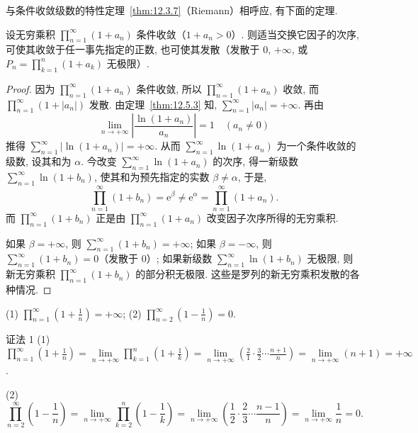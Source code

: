 与条件收敛级数的特性定理~\ref{thm:12.3.7}（Riemann）相呼应, 有下面的定理.

\begin{theorem}[条件收敛无穷乘积的特性]\label{thm:12.5.7}
设无穷乘积 $\prod_{n=1}^{\infty}(1+a_{n})$ 条件收敛（$1+a_{n}>0$）. 则适当交换它因子的次序, 可使其收敛于任一事先指定的正数, 也可使其发散（发散于 $0$, $+\infty$, 或 $P_{n}=\prod_{k=1}^{n}(1+a_{k})$ 无极限）.
\end{theorem}

\begin{proof}
因为 $\prod_{n=1}^{\infty}(1+a_{n})$ 条件收敛, 所以 $\prod_{n=1}^{\infty}(1+a_{n})$ 收敛, 而 $\prod_{n=1}^{\infty}(1+|a_{n}|)$ 发散. 由定理~\ref{thm:12.5.3} 知, $\sum_{n=1}^{\infty}|a_{n}|=+\infty$. 再由
\[
  \lim_{n\to+\infty}\left|\frac{\ln(1+a_{n})}{a_{n}}\right|=1\quad(a_{n}\neq0)
\]
推得 $\sum_{n=1}^{\infty}|\ln(1+a_{n})|=+\infty$. 从而 $\sum_{n=1}^{\infty}\ln(1+a_{n})$ 为一个条件收敛的级数, 设其和为 $\alpha$. 今改变 $\sum_{n=1}^{\infty}\ln(1+a_{n})$ 的次序, 得一新级数 $\sum_{n=1}^{\infty}\ln(1+b_{n})$, 使其和为预先指定的实数 $\beta\neq\alpha$, 于是,
\[
  \prod_{n=1}^{\infty}(1+b_{n})=\mathrm{e}^{\beta}\neq\mathrm{e}^{\alpha}=\prod_{n=1}^{\infty}(1+a_{n}).
\]
而 $\prod_{n=1}^{\infty}(1+b_{n})$ 正是由 $\prod_{n=1}^{\infty}(1+a_{n})$ 改变因子次序所得的无穷乘积.

如果 $\beta=+\infty$, 则 $\sum_{n=1}^{\infty}(1+b_{n})=+\infty$; 如果 $\beta=-\infty$, 则 $\sum_{n=1}^{\infty}(1+b_{n})=0$（发散于 $0$）; 如果新级数 $\sum_{n=1}^{\infty}\ln(1+b_{n})$ 无极限, 则新无穷乘积 $\prod_{n=1}^{\infty}(1+b_{n})$ 的部分积无极限. 这些是罗列的新无穷乘积发散的各种情况.
\end{proof}

\begin{example}\label{ex:12.5.3}
(1) $\prod_{n=1}^{\infty}\left(1+\frac{1}{n}\right)=+\infty$; (2) $\prod_{n=2}^{\infty}\left(1-\frac{1}{n}\right)=0$.
\end{example}

证法 1 (1) $\prod_{n=1}^{\infty}\left(1+\frac{1}{n}\right)=\lim\limits_{n\to+\infty}\prod_{k=1}^{n}\left(1+\frac{1}{k}\right)=\lim\limits_{n\to+\infty}\left(\frac{2}{1}\cdot\frac{3}{2}\cdots\frac{n+1}{n}\right)=\lim\limits_{n\to+\infty}(n+1)=+\infty$.

(2)
\[
  \prod_{n=2}^{\infty}\left(1-\frac{1}{n}\right)=\lim_{n\to+\infty}\prod_{k=2}^{n}\left(1-\frac{1}{k}\right)=\lim_{n\to+\infty}\left(\frac{1}{2}\cdot\frac{2}{3}\cdots\frac{n-1}{n}\right)=\lim_{n\to+\infty}\frac{1}{n}=0.
\]

